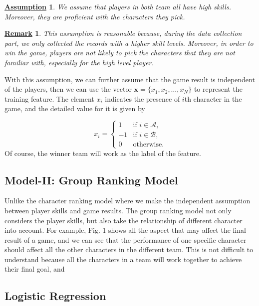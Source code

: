 \documentclass[conference]{IEEEtran}
\newtheorem{assumption}{\underline{Assumption}}
\newtheorem{remark}{\underline{Remark}}
\begin{document}
\begin{assumption}
We assume that players in both team all have high skills. Moreover, they are proficient with the characters they pick.
\end{assumption}

\begin{remark}
This assumption is reasonable because, during the data collection part, we only collected the records with a higher skill levels. Moreover, in order to win the game, players are not likely to pick the characters that they are not familiar with, especially for the high level player.
\end{remark}

With this assumption, we can further assume that the game result is independent of the players, then we can use the vector $\textbf{x}=\{x_1,x_2,\ldots,x_N\}$ to represent the training feature. The element $x_i$ indicates the presence of $i$th character in the game, and the detailed value for it is given by

\begin{equation}
x_i =
\begin{cases}
1 &  \text{if $i\in \mathcal{A},$} \\
-1 &  \text{if $i\in \mathcal{B},$} \\
0 & \text{otherwise.}
\end{cases}
\end{equation}
Of course, the winner team will work as the label of the feature.


\subsection{Model-II: Group Ranking Model}

Unlike the character ranking model where we make the independent assumption between player skills and game results. The group ranking model not only considers the player skills, but also take the relationship of different character into account. For example, Fig. 1 shows all the aspect that may affect the final result of a game, and we can see that the performance of one specific character should affect all the other characters in the different team. This is not difficult to understand because all the characters in a team will work together to achieve their final goal, and 




\subsection{Logistic Regression}
\end{document}
